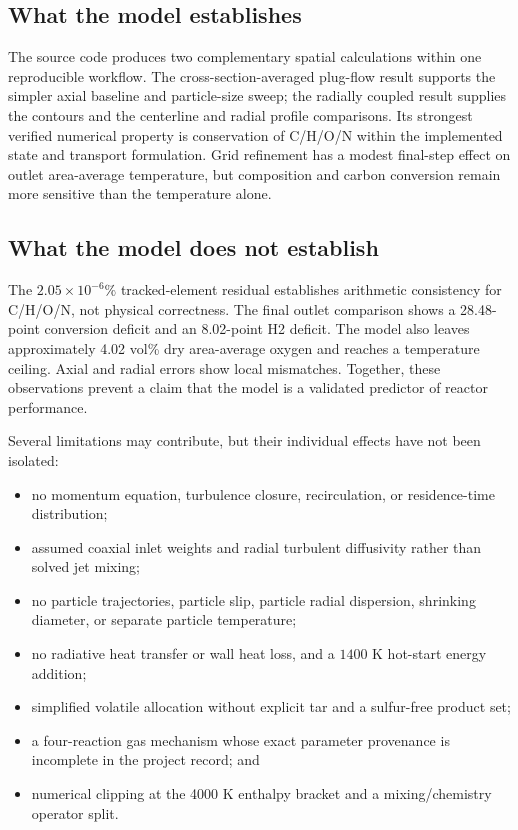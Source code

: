 \documentclass[journal]{IEEEtran}
\begin{document}
\subsection{What the model establishes}
The source code produces two complementary spatial calculations within one reproducible workflow. The cross-section-averaged plug-flow result supports the simpler axial baseline and particle-size sweep; the radially coupled result supplies the contours and the centerline and radial profile comparisons. Its strongest verified numerical property is conservation of C/H/O/N within the implemented state and transport formulation. Grid refinement has a modest final-step effect on outlet area-average temperature, but composition and carbon conversion remain more sensitive than the temperature alone.

\subsection{What the model does not establish}
The \(2.05\times10^{-6}\%\) tracked-element residual establishes arithmetic consistency for C/H/O/N, not physical correctness. The final outlet comparison shows a 28.48-point conversion deficit and an 8.02-point H2 deficit. The model also leaves approximately 4.02 vol\% dry area-average oxygen and reaches a temperature ceiling. Axial and radial errors show local mismatches. Together, these observations prevent a claim that the model is a validated predictor of reactor performance.

Several limitations may contribute, but their individual effects have not been isolated:
\begin{itemize}
  \item no momentum equation, turbulence closure, recirculation, or residence-time distribution;
  \item assumed coaxial inlet weights and radial turbulent diffusivity rather than solved jet mixing;
  \item no particle trajectories, particle slip, particle radial dispersion, shrinking diameter, or separate particle temperature;
  \item no radiative heat transfer or wall heat loss, and a \(1400\) K hot-start energy addition;
  \item simplified volatile allocation without explicit tar and a sulfur-free product set;
  \item a four-reaction gas mechanism whose exact parameter provenance is incomplete in the project record; and
  \item numerical clipping at the 4000 K enthalpy bracket and a mixing/chemistry operator split.
\end{itemize}
\end{document}
